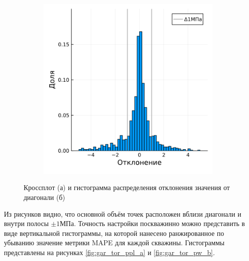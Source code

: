 \documentclass[14pt]{article}
\begin{document}
\begin{figure}[!htb]
\begin{subfigure}[b]{0.45\linewidth}
		\includegraphics[width=\linewidth]{pic/gar_hg}
		\caption{}
		\label{fig:hist_ppl_gar}
	\end{subfigure}
	\label{fig:gar_er_ppl}
	\caption{Кроссплот (а) и гистограмма распределения отклонения значения от диагонали (б)}
\end{figure}
Из рисунков видно, что основной объём точек расположен вблизи диагонали и внутри полосы $\pm1МПа$. Точность настройки поскважинно можно представить в виде вертикальной гистограммы, на которой нанесено ранжированное по убыванию значение метрики MAPE для каждой скважины. Гистограммы представлены на рисунках \ref{fig:gar_tor_ppl_a} и \ref{fig:gar_tor_pw_b}.
\end{document}
